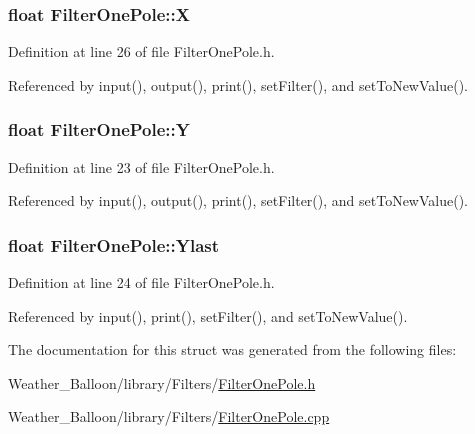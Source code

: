 \subsubsection[{\texorpdfstring{X}{X}}]{\setlength{\rightskip}{0pt plus 5cm}float Filter\+One\+Pole\+::X}\hypertarget{struct_filter_one_pole_a8270ac992e09c0edd3405a59809f28e5}{}\label{struct_filter_one_pole_a8270ac992e09c0edd3405a59809f28e5}


Definition at line 26 of file Filter\+One\+Pole.\+h.



Referenced by input(), output(), print(), set\+Filter(), and set\+To\+New\+Value().

\subsubsection[{\texorpdfstring{Y}{Y}}]{\setlength{\rightskip}{0pt plus 5cm}float Filter\+One\+Pole\+::Y}\hypertarget{struct_filter_one_pole_ad56691be0ad6f6958b9510f4c16538ad}{}\label{struct_filter_one_pole_ad56691be0ad6f6958b9510f4c16538ad}


Definition at line 23 of file Filter\+One\+Pole.\+h.



Referenced by input(), output(), print(), set\+Filter(), and set\+To\+New\+Value().

\subsubsection[{\texorpdfstring{Ylast}{Ylast}}]{\setlength{\rightskip}{0pt plus 5cm}float Filter\+One\+Pole\+::\+Ylast}\hypertarget{struct_filter_one_pole_aadcc9674d50c233b8fab1228aa338467}{}\label{struct_filter_one_pole_aadcc9674d50c233b8fab1228aa338467}


Definition at line 24 of file Filter\+One\+Pole.\+h.



Referenced by input(), print(), set\+Filter(), and set\+To\+New\+Value().



The documentation for this struct was generated from the following files\+:\begin{DoxyCompactItemize}
\item 
Weather\+\_\+\+Balloon/library/\+Filters/\hyperlink{_filter_one_pole_8h}{Filter\+One\+Pole.\+h}\item 
Weather\+\_\+\+Balloon/library/\+Filters/\hyperlink{_filter_one_pole_8cpp}{Filter\+One\+Pole.\+cpp}\end{DoxyCompactItemize}

